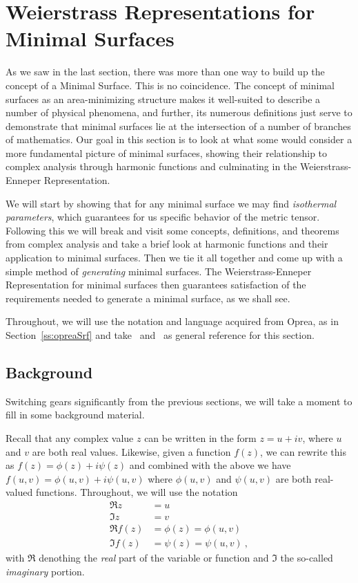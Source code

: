 \section{Weierstrass Representations for Minimal Surfaces}

  As we saw in the last section, there was more than one way to build up the concept of a Minimal Surface. This is no coincidence. The concept of minimal surfaces as an area-minimizing structure makes it well-suited to describe a number of physical phenomena, and further, its numerous definitions just serve to demonstrate that minimal surfaces lie at the intersection of a number of branches of mathematics. Our goal in this section is to look at what some would consider a more fundamental picture of minimal surfaces, showing their relationship to complex analysis through harmonic functions and culminating in the Weierstrass-Enneper Representation.

  We will start by showing that for any minimal surface we may find \emph{isothermal parameters}, which guarantees for us specific behavior of the metric tensor. Following this we will break and visit some concepts, definitions, and theorems from complex analysis and take a brief look at harmonic functions and their application to minimal surfaces. Then we tie it all together and come up with a simple method of \emph{generating} minimal surfaces. The Weierstrass-Enneper Representation for minimal surfaces then guarantees satisfaction of the requirements needed to generate a minimal surface, as we shall see.

  Throughout, we will use the notation and language acquired from Oprea, as in Section~\ref{ss:opreaSrf} and take~\cite{Opr07} and~\cite{Opr00} as general reference for this section.

\subsection{Background}
  Switching gears significantly from the previous sections, we will take a moment to fill in some background material.

  Recall that any complex value $z$ can be written in the form $z = u + iv$, where $u$ and $v$ are both real values. Likewise, given a function $f(z)$, we can rewrite this as $f(z) = \phi(z) + i\psi(z)$ and combined with the above we have $f(u, v) = \phi(u, v) + i \psi(u, v)$ where $\phi(u, v)$ and $\psi(u, v)$ are both real-valued functions. Throughout, we will use the notation
  \begin{align*}
    \Re z &= u\\
    \Im z &= v\\
    \Re f(z) &= \phi(z) = \phi(u, v)\\
    \Im f(z) &= \psi(z) = \psi(u, v) \ , 
  \end{align*}
  with $\Re$ denothing the \emph{real} part of the variable or function and $\Im$ the so-called \emph{imaginary} portion.

